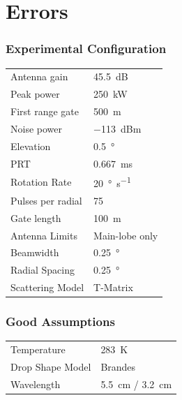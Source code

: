 \documentclass[red]{beamer}
\begin{document}
\section{Errors}
\begin{frame}
	\frametitle{Experimental Configuration}
	\begin{center}
	    \begin{tabular}{ | l | l | }
	        \hline
	        Antenna gain & \SI{45.5}{dB} \\
	        Peak power & \SI{250}{\kilo\watt} \\
	        First range gate & \SI{500}{\meter} \\
	        Noise power & \SI{-113}{dBm} \\
	        Elevation & \SI{0.5}{\degree} \\
	        PRT & \SI{0.667}{\milli\second} \\
	        Rotation Rate & \SI{20}{\degree\per\second} \\
	        Pulses per radial & \num{75} \\
	        Gate length & \SI{100}{\meter} \\
	        Antenna Limits & Main-lobe only \\
			Beamwidth & \SI{0.25}{\degree} \\
			Radial Spacing & \SI{0.25}{\degree} \\
			Scattering Model & T-Matrix \\
			\hline
	    \end{tabular}
	\end{center}
\end{frame}

\begin{frame}
	\frametitle{Good Assumptions}
	\begin{center}
	    \begin{tabular}{ | l | l | }
	        \hline
	        Temperature & \SI{283}{\kelvin} \\
	        Drop Shape Model & Brandes \\
	        Wavelength & \SI{5.5}{\centi\meter} / \SI{3.2}{\centi\meter} \\
			\hline
	    \end{tabular}
	\end{center}	
\end{frame}
\end{document}
